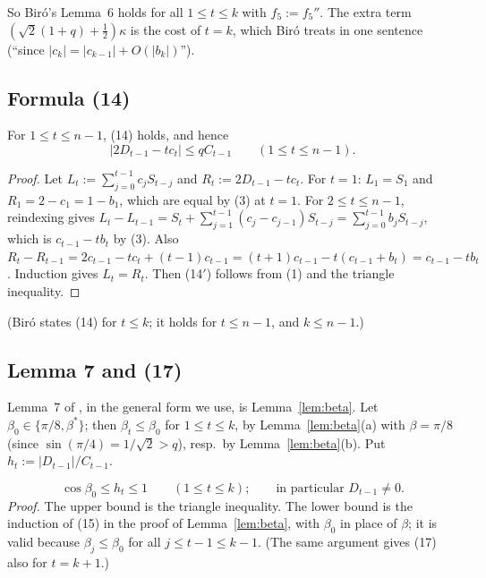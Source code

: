 \documentclass[11pt]{amsart}
\theoremstyle{remark}
\theoremstyle{plain}
\newcommand{\abs}[1]{\lvert #1\rvert}
\begin{document}
So Bir\'o's Lemma~6 holds for all $1\le t\le k$ with $f_5:=f_5''$. The extra term $(\sqrt2(1+q)+\frac12)\kappa$ is the cost of $t=k$, which Bir\'o treats in one sentence (``since $\abs{c_k}=\abs{c_{k-1}}+O(\abs{b_k})$'').

\subsection{Formula (14)}\label{app:14}
For $1\le t\le n-1$, (14) holds, and hence
\begin{equation}\tag{14$'$}
\abs{2D_{t-1}-tc_t}\le qC_{t-1}\qquad(1\le t\le n-1).
\end{equation}
\begin{proof}
Let $L_t:=\sum_{j=0}^{t-1}c_jS_{t-j}$ and $R_t:=2D_{t-1}-tc_t$. For $t=1$: $L_1=S_1$ and $R_1=2-c_1=1-b_1$, which are equal by (3) at $t=1$. For $2\le t\le n-1$, reindexing gives $L_t-L_{t-1}=S_t+\sum_{j=1}^{t-1}(c_j-c_{j-1})S_{t-j}=\sum_{j=0}^{t-1}b_jS_{t-j}$, which is $c_{t-1}-tb_t$ by (3). Also $R_t-R_{t-1}=2c_{t-1}-tc_t+(t-1)c_{t-1}=(t+1)c_{t-1}-t(c_{t-1}+b_t)=c_{t-1}-tb_t$. Induction gives $L_t=R_t$. Then (14$'$) follows from (1) and the triangle inequality.
\end{proof}
(Bir\'o states (14) for $t\le k$; it holds for $t\le n-1$, and $k\le n-1$.)

\subsection{Lemma 7 and (17)}\label{app:17}
Lemma~7 of \cite{Bir00b}, in the general form we use, is Lemma~\ref{lem:beta}. Let $\beta_0\in\{\pi/8,\beta^*\}$; then $\beta_t\le\beta_0$ for $1\le t\le k$, by Lemma~\ref{lem:beta}(a) with $\beta=\pi/8$ (since $\sin(\pi/4)=1/\sqrt2>q$), resp.\ by Lemma~\ref{lem:beta}(b). Put $h_t:=\abs{D_{t-1}}/C_{t-1}$.

\begin{equation}\tag{17}
\cos\beta_0\le h_t\le1\qquad(1\le t\le k);\qquad\text{in particular } D_{t-1}\ne0.
\end{equation}
\emph{Proof.} The upper bound is the triangle inequality. The lower bound is the induction of (15) in the proof of Lemma~\ref{lem:beta}, with $\beta_0$ in place of $\beta$; it is valid because $\beta_j\le\beta_0$ for all $j\le t-1\le k-1$. (The same argument gives (17) also for $t=k+1$.)
\end{document}
